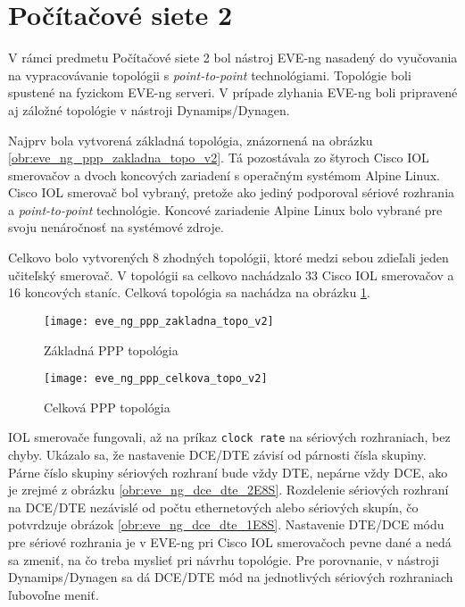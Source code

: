 \section{Počítačové siete 2}

V rámci predmetu Počítačové siete 2 bol nástroj EVE-ng nasadený do vyučovania na vypracovávanie topológii s \emph{point-to-point} technológiami. Topológie boli spustené na fyzickom EVE-ng serveri. V prípade zlyhania EVE-ng boli pripravené aj záložné topológie v nástroji Dynamips/Dynagen.

Najprv bola vytvorená základná topológia, znázornená na obrázku \ref{obr:eve_ng_ppp_zakladna_topo_v2}. Tá pozostávala zo štyroch Cisco IOL smerovačov a dvoch koncových zariadení s operačným systémom Alpine Linux. Cisco IOL smerovač bol vybraný, pretože ako jediný podporoval sériové rozhrania a \emph{point-to-point} technológie. Koncové zariadenie Alpine Linux bolo vybrané pre svoju nenáročnosť na systémové zdroje.

Celkovo bolo vytvorených 8 zhodných topológii, ktoré medzi sebou zdieľali jeden učiteľský smerovač. V topológii sa celkovo nachádzalo 33 Cisco IOL smerovačov a 16 koncových staníc. Celková topológia sa nachádza na obrázku \ref{obr:eve_ng_ppp_celkova_topo_v2}.

\begin{figure}
    \centering
    \texttt{[image: eve\_ng\_ppp\_zakladna\_topo\_v2]}
    \caption{Základná PPP topológia}
    \label{obr:eve_ng_ppp_zakladna_topo_v2}

    \vspace{3cm}

    \centering
    \texttt{[image: eve\_ng\_ppp\_celkova\_topo\_v2]}
    \caption{Celková PPP topológia}
    \label{obr:eve_ng_ppp_celkova_topo_v2}
\end{figure}

IOL smerovače fungovali, až na príkaz \texttt{clock rate} na sériových rozhraniach, bez chyby. Ukázalo sa, že nastavenie DCE/DTE závisí od párnosti čísla skupiny. Párne číslo skupiny sériových rozhraní bude vždy DTE, nepárne vždy DCE, ako je zrejmé z obrázku \ref{obr:eve_ng_dce_dte_2E8S}. Rozdelenie sériových rozhraní na DCE/DTE nezávislé od počtu ethernetových alebo sériových skupín, čo potvrdzuje obrázok \ref{obr:eve_ng_dce_dte_1E8S}. Nastavenie DTE/DCE módu pre sériové rozhrania je v EVE-ng pri Cisco IOL smerovačoch pevne dané a nedá sa zmeniť, na čo treba myslieť pri návrhu topológie. Pre porovnanie, v nástroji Dynamips/Dynagen sa dá DCE/DTE mód na jednotlivých sériových rozhraniach ľubovoľne meniť.

